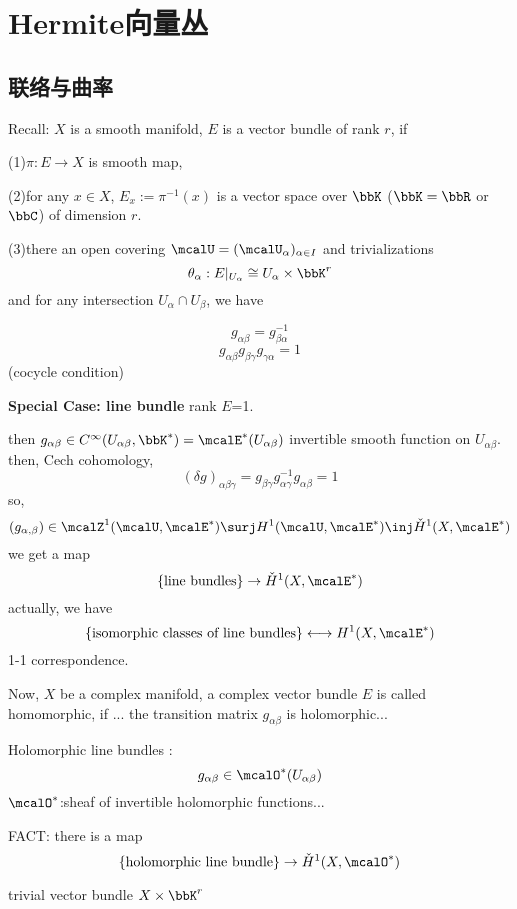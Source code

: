 \chapter{Hermite向量丛}
\section{联络与曲率}

Recall: $X$ is a smooth manifold, $E$ is a vector bundle of rank $r$, if

(1)$\pi:E\to X$ is smooth map,

(2)for any $x\in X$, $E_x:=\pi^{-1}(x)$ is a vector space over $\bbK$
($\bbK=\bbR$ or $\bbC$) of dimension $r$.

(3)there an open covering $\mcalU=(\mcalU_{\alpha})_{\alpha\in I}$ and trivializations
$$\theta_\alpha: E|_{U_{\alpha}}\cong U_{\alpha}\times \bbK^r$$
and for any intersection $U_{\alpha}\cap U_{\beta}$, we have

\begin{rem}
$$g_{\alpha\beta}=g_{\beta\alpha}^{-1}$$
$$g_{\alpha\beta}g_{\beta\gamma}g_{\gamma\alpha}=1$$
(cocycle condition)
\end{rem}

\textbf{Special Case: line bundle}
rank $E$=1.

then $g_{\alpha\beta}\in C^{\infty}(U_{\alpha\beta},\bbK^*)=\mcalE^*(U_{\alpha\beta})$
invertible smooth function on $U_{\alpha\beta}$.
then, Cech cohomology,
$$(\delta g)_{\alpha\beta\gamma}=g_{\beta\gamma}g_{\alpha\gamma}^{-1}g_{\alpha\beta}=1$$
so,
$$(g_{\alpha,\beta})\in\mcalZ^1(\mcalU,\mcalE^*)
\surj H^1(\mcalU,\mcalE^*)\inj\check{H}^1(X,\mcalE^*)$$
we get a map
$$\{\text{line bundles}\}\to \check{H}^1(X,\mcalE^*)$$
actually, we have
$$\{\text{isomorphic classes of line bundles}\}
\longleftrightarrow H^1(X,\mcalE^*)$$
1-1 correspondence.

Now, $X$ be a complex manifold,
a complex vector bundle $E$ is called homomorphic,
if ... the transition matrix $g_{\alpha\beta}$ is holomorphic...

Holomorphic line bundles :
$$g_{\alpha\beta}\in\mcalO^*(U_{\alpha\beta})$$
$\mcalO^*$:sheaf of invertible holomorphic functions...

FACT: there is a map
$$\{\text{holomorphic line bundle}\}\to\check{H}^1(X,\mcalO^*)$$

\begin{example}trivial vector bundle $X\times\bbK^r$
\end{example}

